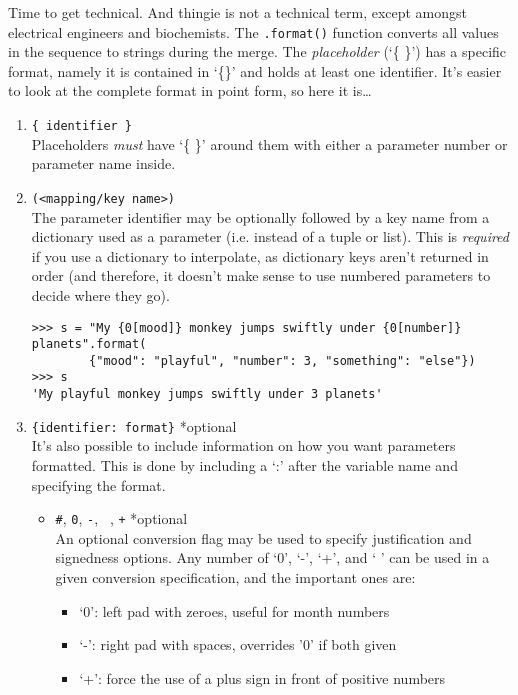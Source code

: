 Time to get technical. And thingie is not a technical term, except   amongst electrical engineers and biochemists. The \texttt{.format()} function converts      all values in the sequence to strings   during the merge. The \textit{placeholder} (`\{ \}') has a specific format, namely it is contained in `\{\}'   and holds at least one identifier. It's easier to look at the complete format in point form, so here it is\ldots
\begin{enumerate}
	\item 
\texttt{\{ identifier \}}
\\        Placeholders  \textit{must} have `\{ \}' around them with        either a parameter number or parameter name inside.
	\item 
\texttt{(<mapping/key name>)} 
\\        The parameter identifier may be optionally followed by a key name from a dictionary    used as a parameter (i.e. instead of a tuple or list). This    is \textit{required} if you use a dictionary to    interpolate, as dictionary keys aren't returned in order (and therefore,       it doesn't make sense to use numbered parameters to decide where they go). 
\begin{lstlisting}
>>> s = "My {0[mood]} monkey jumps swiftly under {0[number]} planets".format(
        {"mood": "playful", "number": 3, "something": "else"})
>>> s
'My playful monkey jumps swiftly under 3 planets'
\end{lstlisting}
	\item 
\texttt{\{identifier: format\}} *optional
\\       It's also possible to include information on how you want parameters formatted.       This is done by including a `:' after the variable name and specifying the format.        
\begin{itemize}
	\item 
\texttt{\#}, 
\texttt{0}, 
\texttt{-},    
\texttt{ }, 
\texttt{+} *optional
\\        An optional conversion flag may be used to specify justification    and signedness options. Any number of `0', `-', `+', and ` '    can be used in a given conversion specification, and the important    ones are:      
\begin{itemize}
	\item `0': left pad with zeroes, useful for month      numbers
	\item `-': right pad with spaces, overrides '0' if both      given
	\item `+': force the use of a plus sign in front of positive      numbers

\end{itemize}
\end{itemize}
\end{enumerate}
